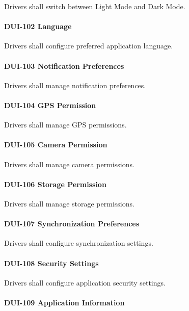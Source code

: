 Drivers shall switch between Light Mode and Dark Mode.

\paragraph{DUI-102 Language}

Drivers shall configure preferred application language.

\paragraph{DUI-103 Notification Preferences}

Drivers shall manage notification preferences.

\paragraph{DUI-104 GPS Permission}

Drivers shall manage GPS permissions.

\paragraph{DUI-105 Camera Permission}

Drivers shall manage camera permissions.

\paragraph{DUI-106 Storage Permission}

Drivers shall manage storage permissions.

\paragraph{DUI-107 Synchronization Preferences}

Drivers shall configure synchronization settings.

\paragraph{DUI-108 Security Settings}

Drivers shall configure application security settings.

\paragraph{DUI-109 Application Information}


